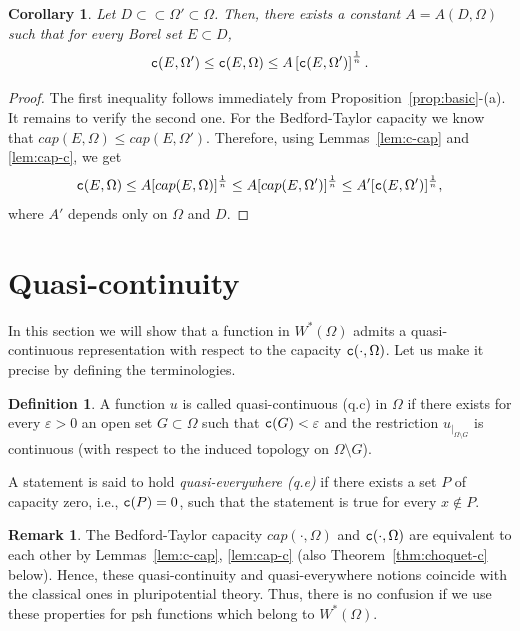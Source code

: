 \documentclass{amsart}
\newcommand{\veps}{\varepsilon}
\newcommand{\tc}{{\tt c}}
\newcommand{\Om}{\Omega}
\newtheorem{cor}[thm]{Corollary}
\theoremstyle{definition}
\newtheorem{defn}[thm]{Definition}
\newtheorem{remark}[thm]{Remark}
\numberwithin{thm}{section}
\numberwithin{equation}{section}
\renewcommand{\[}{\begin{equation}}
\renewcommand{\]}{\end{equation}}
\begin{document}
\begin{cor}\label{cor:dom-equiv-c} Let $D \subset \subset \Om' \subset \Om$. Then, there exists a constant $A = A(D,\Om)$ such that for every Borel set $E \subset D$,
$$
	\tc (E, \Om') \leq \tc (E, \Om) \leq A \left[\tc (E,\Om')\right]^\frac{1}{n}.
$$
\end{cor}

\begin{proof} The first inequality follows immediately from Proposition~\ref{prop:basic}-(a). It remains to verify the second one. For the Bedford-Taylor capacity we know that
$cap(E, \Om) \leq cap(E,\Om')$. Therefore, using Lemmas~\ref{lem:c-cap} and \ref{lem:cap-c}, we get
$$
	\tc(E, \Om) \leq A [cap(E, \Om)]^\frac{1}{n} \leq A [cap(E,\Om')]^\frac{1}{n} \leq A' [\tc (E,\Om')]^\frac{1}{n},
$$
where $A'$ depends only on $\Om$ and $D$.
\end{proof}



\section{Quasi-continuity}

In this section we will show that a function in $W^*(\Om)$ admits a quasi-continuous representation with respect to the capacity $\tc(\cdot,\Om)$. Let us make it precise by defining the terminologies. 

\begin{defn} \label{defn:c-quasi-c} A function $u$ is called quasi-continuous (q.c) in $\Om$ if there exists for every $\veps> 0$ an open set $G \subset \Om$ such that $\tc (G)<\veps$ and the restriction $u_{|_{\Om\setminus G}}$  is continuous  (with respect to the induced topology on $\Om\setminus G$).
\end{defn}

A statement is said to hold {\em quasi-everywhere (q.e)} if there exists a set $P$ of capacity zero, i.e., $\tc (P) =0$, such that the statement is true for every $x\notin P$.

\begin{remark}\label{rmk:no-conf} The Bedford-Taylor capacity $cap(\cdot, \Om)$ and $\tc (\cdot, \Om)$  are equivalent to each other by Lemmas~\ref{lem:c-cap}, \ref{lem:cap-c} (also Theorem~\ref{thm:choquet-c} below). Hence, these quasi-continuity and quasi-everywhere notions coincide with the classical ones in pluripotential theory.  Thus, there is no confusion if we use these properties for psh functions which belong to $W^*(\Om)$.
\end{remark}
\end{document}
